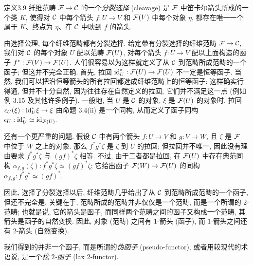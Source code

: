 \begin{origstatement}{定义}{3.9}\label{ch03:def39}
纤维范畴 $\mathcal F\to\mathcal C$ 的一个\emph{分裂选择} (cleavage) 是 $\mathcal F$ 中笛卡尔箭头所成的一个类 $K$, 使得对 $\mathcal C$ 中每个箭头 $f:U\to V$ 和 $\mathcal F(V)$ 中每个对象 $\eta$, 都存在唯一一个属于 $K$、终点为 $\eta$、在 $\mathcal C$ 中映到 $f$ 的箭头.
\end{origstatement}

由选择公理, 每个纤维范畴都有分裂选择. 给定带有分裂选择的纤维范畴 $\mathcal F\to\mathcal C$, 我们对 $\mathcal C$ 的每个对象 $U$ 配以范畴 $\mathcal F(U)$, 对每个箭头 $f:U\to V$ 配以上面构造的函子 $f^*:\mathcal F(V)\to\mathcal F(U)$. 人们很容易以为这样就定义了从 $\mathcal C$ 到范畴所成范畴的一个函子; 但这并不完全正确. 首先, 拉回 $\mathrm{id}_U^*:\mathcal F(U)\to\mathcal F(U)$ 不一定是恒等函子. 当然, 我们可以把沿恒等箭头的所有拉回都选成纤维范畴上的恒等函子: 这样确实行得通, 但并不十分自然, 因为往往存在自然定义的拉回, 它们并不满足这一点 (例如例 3.15 及其他许多例子). 一般地, 当 $U$ 是 $\mathcal C$ 的对象, $\xi$ 是 $\mathcal F(U)$ 的对象时, 拉回 $\epsilon_U(\xi):\mathrm{id}_U^*\xi\to\xi$ 由命题 3.4(ii) 是一个同构, 从而定义了函子同构 $\epsilon_U:\mathrm{id}_U^*\simeq\mathrm{id}_{\mathcal F(U)}$.

还有一个更严重的问题. 假设 $\mathcal C$ 中有两个箭头 $f:U\to V$ 和 $g:V\to W$, 且 $\zeta$ 是 $\mathcal F$ 中位于 $W$ 之上的对象. 那么 $f^*g^*\zeta$ 是 $\zeta$ 到 $U$ 的拉回; 但拉回并不唯一, 因此没有理由要求 $f^*g^*\zeta$ 与 $(gf)^*\zeta$ 相等. 不过, 由于二者都是拉回, 在 $\mathcal F(U)$ 中存在典范同构 $\alpha_{f,g}(\zeta):f^*g^*\zeta\simeq(gf)^*\zeta$; 它给出函子 $\mathcal F(W)\to\mathcal F(U)$ 的同构 $\alpha_{f,g}:f^*g^*\simeq(gf)^*$.

因此, 选择了分裂选择以后, 纤维范畴几乎给出了从 $\mathcal C$ 到范畴所成范畴的一个函子, 但还不完全是. 关键在于, 范畴所成的范畴并非仅仅是一个范畴, 而是一个所谓的 $2$-范畴; 也就是说, 它的箭头是函子, 而同样两个范畴之间的函子又构成一个范畴, 其箭头是函子的自然变换. 因此, 对象 (范畴) 之间有 $1$-箭头 (函子), 而 $1$-箭头之间还有 $2$-箭头 (自然变换).

我们得到的并非一个函子, 而是所谓的\emph{伪函子} (pseudo-functor), 或者用较现代的术语说, 是一个\emph{松 $2$-函子} (lax $2$-functor).

